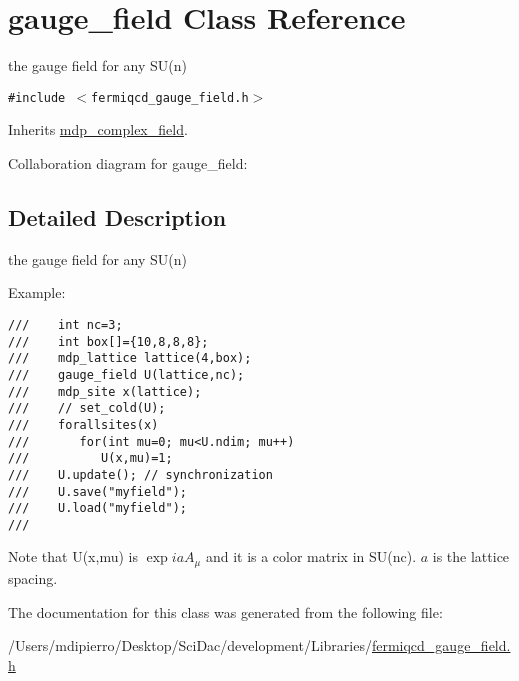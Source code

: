 \hypertarget{classgauge__field}{
\section{gauge\_\-field Class Reference}
\label{classgauge__field}
}
the gauge field for any SU(n)  


{\tt \#include $<$fermiqcd\_\-gauge\_\-field.h$>$}

Inherits \hyperlink{classmdp__complex__field}{mdp\_\-complex\_\-field}.

Collaboration diagram for gauge\_\-field:

\subsection{Detailed Description}
the gauge field for any SU(n) 

Example: 

\footnotesize\begin{verbatim}
///    int nc=3; 
///    int box[]={10,8,8,8};
///    mdp_lattice lattice(4,box);
///    gauge_field U(lattice,nc);
///    mdp_site x(lattice);
///    // set_cold(U);
///    forallsites(x)
///       for(int mu=0; mu<U.ndim; mu++)
///          U(x,mu)=1;
///    U.update(); // synchronization
///    U.save("myfield");
///    U.load("myfield");
/// \end{verbatim}
\normalsize
 Note that U(x,mu) is $ \exp{iaA_{\mu}} $ and it is a color matrix in SU(nc). $a$ is the lattice spacing. 

The documentation for this class was generated from the following file:\begin{CompactItemize}
\item 
/Users/mdipierro/Desktop/SciDac/development/Libraries/\hyperlink{fermiqcd__gauge__field_8h}{fermiqcd\_\-gauge\_\-field.h}\end{CompactItemize}
